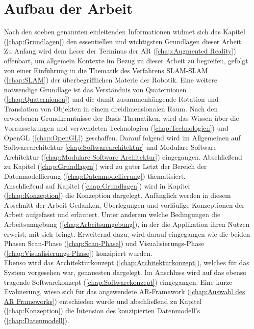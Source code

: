 \section{Aufbau der Arbeit}
\label{chap:Aufbau der Arbeit}
Nach den soeben genannten einleitenden Informationen widmet sich das Kapitel (\ref{chap:Grundlagen}) den essentiellen und wichtigsten 
Grundlagen dieser Arbeit. Zu Anfang wird dem Leser der Terminus der \acl{AR} (\ref{chap:Augmented Reality}) offenbart, um allgemein 
Kontexte im Bezug zu dieser Arbeit zu begreifen, gefolgt von einer Einführung in die Thematik des Verfahrens \ac{SLAM}-\acl{SLAM} 
(\ref{chap:SLAM}) der überbegrifflichen Materie der Robotik. Eine weitere notwendige Grundlage ist das Verständnis von Quaternionen 
(\ref{chap:Quaternionen}) und die damit zusammenhängende Rotation und Translation von Objekten in einem dreidimensionalen Raum. Nach 
den erworbenen Grundkenntnisse der Basis-Thematiken, wird das Wissen über die Voraussetzungen und verwendeten Technologien 
(\ref{chap:Technologien}) und OpenGL (\ref{chap:OpenGL}) geschaffen. Darauf folgend wird im Allgemeinen auf Softwarearchitektur 
\ref{chap:Softwarearchitektur} und Modulare Software Architektur (\ref{chap:Modulare Software Architektur}) eingegangen. Abschließend zu 
Kapitel (\ref{chap:Grundlagen}) wird zu guter Letzt der Bereich der Datenmodellierung (\ref{chap:Datenmodellierung}) thematisiert.
\\ 
\linebreak
Anschließend auf Kapitel (\ref{chap:Grundlagen}) wird in Kapitel (\ref{chap:Konzeption}) die Konzeption dargelegt. Anfänglich werden in 
diesem Abschnitt der Arbeit Gedanken, Überlegungen und vorläufige Konzeptionen der Arbeit aufgefasst und erläutert. Unter anderem 
welche Bedingungen die Arbeitsumgebung (\ref{chap:Arbeitsumgebung}), in der die Applikation ihren Nutzen erweist, mit sich bringt. 
Erweiternd dazu, wird darauf eingegangen wie die beiden Phasen Scan-Phase (\ref{chap:Scan-Phase}) und Visualisierungs-Phase 
(\ref{chap:Visualisierungs-Phase}) konzipiert wurden. 
\\ 
Ebenso wird das Architekturkonzept (\ref{chap:Architekturkonzept}), welches für das System vorgesehen war, genauesten dargelegt. 
Im Anschluss wird auf das ebenso tragende Softwarekonzept (\ref{chap:Softwarekonzept}) eingegangen. Eine kurze Evaluierung, wieso sich 
für das angewendete \acs{AR}-Framework (\ref{chap:Auswahl des AR Frameworks}) entschieden wurde und abschließend zu Kapitel 
(\ref{chap:Konzeption}) die Intension des konzipierten Datenmodell's (\ref{chap:Datenmodell}). 
